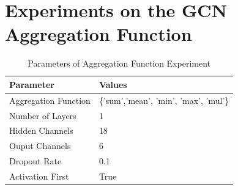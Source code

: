 \section{Experiments on the \ac{GCN} Aggregation Function} \label{appendix:aggr}

\begin{table}
	\begin{tabular}{|l|l|}
		\hline
		\textbf{Parameter} & \textbf{Values} \\
		\hline
		Aggregation Function & \{'sum','mean', 'min', 'max', 'mul'\} \\
		\hline
		Number of Layers & 1 \\
		\hline
		Hidden Channels & 18 \\
		\hline
		Ouput Channels & 6 \\
		\hline 
		Dropout Rate & 0.1 \\
		\hline
		Activation First & True \\
		\hline
	\end{tabular}
	\caption{Parameters of Aggregation Function Experiment}
	\label{table:aggr-params}
\end{table}

